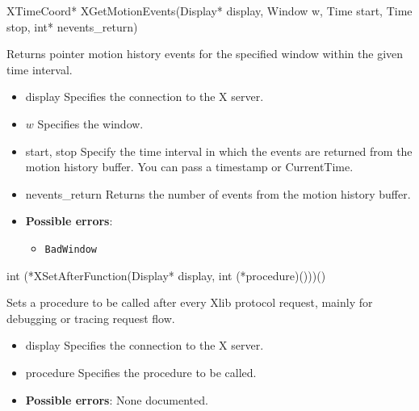 \documentclass{report}
\begin{document}
\begin{itemize}
        \begin{cppcode}
            XTimeCoord* XGetMotionEvents(Display* display, Window w, Time start, Time stop, int* nevents_return)
        \end{cppcode}
        \bigbreak \noindent
        Returns pointer motion history events for the specified window within the given time interval.

        \begin{itemize}
            \item display Specifies the connection to the X server.
            \item $w$ Specifies the window.
            \item start, stop Specify the time interval in which the events are returned from the motion history buffer. You can pass a timestamp or CurrentTime.
            \item nevents\_return Returns the number of events from the motion history buffer.
        \end{itemize}

        \begin{itemize}
            \item \textbf{Possible errors}:
                \begin{itemize}
                    \item \texttt{BadWindow}
                \end{itemize}
        \end{itemize}

        \begin{cppcode}
            int (*XSetAfterFunction(Display* display, int (*procedure)()))()
        \end{cppcode}
        \bigbreak \noindent
        Sets a procedure to be called after every Xlib protocol request, mainly for debugging or tracing request flow.

        \begin{itemize}
            \item display Specifies the connection to the X server.
            \item procedure Specifies the procedure to be called.
        \end{itemize}

        \begin{itemize}
            \item \textbf{Possible errors}: None documented.
        \end{itemize}


\end{itemize}
\end{document}
